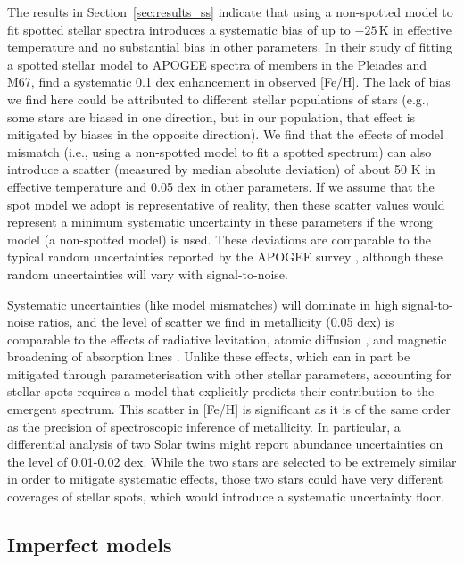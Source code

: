 The results in Section~\ref{sec:results_ss} indicate that using a non-spotted model to fit spotted stellar spectra introduces a systematic bias of up to $-25$\,K in effective temperature and no substantial bias in other parameters. In their study of fitting a spotted stellar model to APOGEE spectra of members in the Pleiades and M67, \citet{cao_starspots_2022} find a systematic 0.1 dex enhancement in observed [Fe/H]. The lack of bias we find here could be attributed to different stellar populations of stars (e.g., some stars are biased in one direction, but in our population, that effect is mitigated by biases in the opposite direction). We find that the effects of model mismatch (i.e., using a non-spotted model to fit a spotted spectrum) can also introduce a scatter (measured by median absolute deviation) of about 50 K in effective temperature and 0.05 dex in other parameters. If we assume that the spot model we adopt is representative of reality, then these scatter values would represent a minimum systematic uncertainty in these parameters if the wrong model (a non-spotted model) is used. These deviations are comparable to the typical random uncertainties reported by the APOGEE survey \citep[150K, 0.13 dex and 0.1 dex;][]{hegedus_comparative_2022}, although these random uncertainties will vary with signal-to-noise. 


Systematic uncertainties (like model mismatches) will dominate in high signal-to-noise ratios, and the level of scatter we find in metallicity (0.05 dex) is comparable to the effects of radiative levitation, atomic diffusion \citep{onehag_abundances_2014}, and magnetic broadening of absorption lines \citep{spina_how_2020}. Unlike these effects, which can in part be mitigated through parameterisation with other stellar parameters, accounting for stellar spots requires a model that explicitly predicts their contribution to the emergent spectrum. This scatter in [Fe/H] is significant as it is of the same order as the precision of spectroscopic inference of metallicity. In particular, a differential analysis of two Solar twins might report abundance uncertainties on the level of 0.01-0.02 dex. While the two stars are selected to be extremely similar in order to mitigate systematic effects, those two stars could have very different coverages of stellar spots, which would introduce a systematic uncertainty floor. 

\subsection{Imperfect models}

